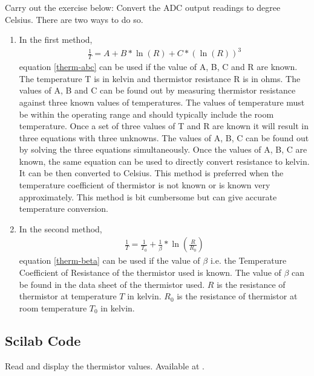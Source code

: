 \begin{exercise}
  Carry out the exercise below: Convert the ADC output readings to
  degree Celsius. There are two ways to do so.
\begin{enumerate}
\item  In the first method,
\begin{align}
\frac{1}{T}=A+B*\ln(R)+C*(\ln(R))^3
\label{therm-abc}
\end{align}
equation \ref{therm-abc} can be used if the value of A, B, C and R are
known. The temperature T is in kelvin and thermistor resistance R is
in ohms. The values of A, B and C can be found out by measuring
thermistor resistance against three known values of temperatures. The
values of temperature must be within the operating range and should
typically include the room temperature. Once a set of three values of
T and R are known it will result in three equations with three
unknowns. The values of A, B, C can be found out by solving the three
equations simultaneously. Once the values of A, B, C are known, the
same equation can be used to directly convert resistance to kelvin. It
can be then converted to Celsius. This method is preferred when the
temperature coefficient of thermistor is not known or is known very
approximately. This method is bit cumbersome but can give accurate
temperature conversion.

\item In the second method,
\begin{align}
\frac{1}{T}=\frac{1}{T_0}+\frac{1}{\beta}*\ln\left(\frac{R}{R_0}\right)
\label{therm-beta}
\end{align}
equation \ref{therm-beta} can be used if the value of $\beta$ i.e. the
Temperature Coefficient of Resistance of the thermistor used is
known. The value of $\beta$ can be found in the data sheet of the
thermistor used. $R$ is the resistance of thermistor at temperature
$T$ in kelvin.  $R_0$ is the resistance of thermistor at room
temperature $T_0$ in kelvin.
\end{enumerate}
\end{exercise}

\subsection{Scilab Code}
\label{sec:therm-scilab-code}

\begin{scicode}
   {Read and display
    the thermistor values.  Available at
    .}
\label{sci:therm-read}

\end{scicode}

